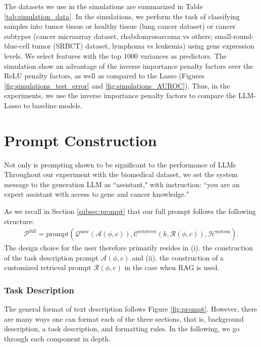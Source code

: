 The datasets we use in the simulations are summarized in Table \ref{tab:simulation_data}. In the simulations, we perform the task of classifying samples into tumor tissue or healthy tissue (lung cancer dataset) or cancer subtypes (cancer microarray dataset, rhabdomyosarcoma vs others; small-round-blue-cell tumor (SRBCT) dataset, lymphoma vs leukemia) using gene expression levels. We select features with the top 1000 variances as predictors. The simulation show an advantage of the inverse importance penalty factors over the ReLU penalty factors, as well as compared to the Lasso (Figures \ref{fig:simulations_test_error} and  \ref{fig:simulations_AUROC}). Thus, in the experiments, we use the inverse importance penalty factors to compare the LLM-Lasso to baseline models.

\section{Prompt Construction}\label{subsec:prompt_constr} 

Not only is prompting shown to be significant to the performance of LLMs
Throughout our experiment with the biomedical dataset, we set the system message to the generation LLM as ``assistant," with instruction: ``you are an expert assistant with access to gene and cancer knowledge."

As we recall in Section \ref{subsec:prompt} that our full prompt follows the following structure: 
\begin{align*}
\mathcal{P}^{\text{full}} = \text{prompt}(\mathcal{Q}^{\text{user}}(\mathcal{A}(\phi,c)), \mathcal{C}^{\text{retriever}}(k,\mathcal{R}(\phi,c)), \mathcal{H}^{\text{system}}). 
\end{align*}
The design choice for the user therefore primarily resides in (i). the construction of the task description prompt $\mathcal{A}(\phi,c)$ and (ii). the construction of a customized retrieval prompt $\mathcal{R}(\phi,c)$ in the case when RAG is used. 
\subsubsection{Task Description} The general format of text description follows Figure \ref{fig:prompt}. However, there are many ways one can format each of the three sections, that is, background description, a task description, and formatting rules. In the following, we go through each component in depth.
